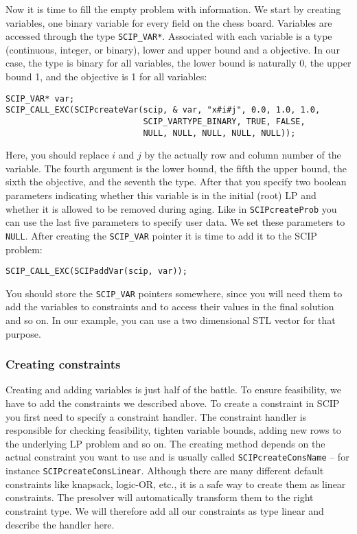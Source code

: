 \documentclass[a4paper]{article}
\begin{document}
Now it is time to fill the empty problem with information. We start by creating variables, one binary variable for every
field on the chess board. Variables are accessed through the type \verb+SCIP_VAR*+. Associated with each variable is a
type (continuous, integer, or binary), lower and upper bound and a objective. In our case, the type is binary for all
variables, the lower bound is naturally 0, the upper bound 1, and the objective is 1 for all variables:
\begin{verbatim}
SCIP_VAR* var;
SCIP_CALL_EXC(SCIPcreateVar(scip, & var, "x#i#j", 0.0, 1.0, 1.0,
                            SCIP_VARTYPE_BINARY, TRUE, FALSE,
                            NULL, NULL, NULL, NULL, NULL));
\end{verbatim}
Here, you should replace $i$ and $j$ by the actually row and column number of the variable. The fourth argument is the
lower bound, the fifth the upper bound, the sixth the objective, and the seventh the type. After that you specify two
boolean parameters indicating whether this variable is in the initial (root) LP and whether it is allowed to be removed
during aging. Like in \verb+SCIPcreateProb+ you can use the last five parameters to specify user data. We set these
parameters to \verb+NULL+. After creating the \verb+SCIP_VAR+ pointer it is time to add it to the SCIP problem:
\begin{verbatim}
SCIP_CALL_EXC(SCIPaddVar(scip, var));
\end{verbatim}
You should store the \verb+SCIP_VAR+ pointers somewhere, since you will need them to add the variables to constraints and to access their values in the final solution and so on. In our example, you can use a two dimensional STL vector for that purpose.


\subsubsection{Creating constraints}

Creating and adding variables is just half of the battle. To ensure feasibility, we have to add the constraints we described above. To create a constraint in SCIP you first need to specify a constraint handler. The constraint handler is responsible for checking feasibility, tighten variable bounds, adding new rows to the underlying LP problem and so on. The creating method depends on the actual constraint you want to use and is  usually called \verb+SCIPcreateConsName+ -- for instance \verb+SCIPcreateConsLinear+. Although there are many different default constraints like knapsack, logic-OR, etc., it is a safe way to create them as linear constraints. The presolver will automatically transform them to the right constraint type. We will therefore add all our constraints as type linear and describe the handler here.
\end{document}
